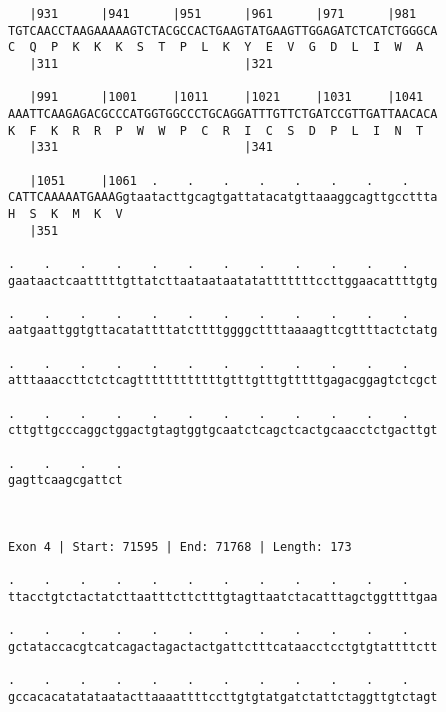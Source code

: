 \documentclass{article}
\begin{document}
\begin{Verbatim}
   |931      |941      |951      |961      |971      |981   
TGTCAACCTAAGAAAAAGTCTACGCCACTGAAGTATGAAGTTGGAGATCTCATCTGGGCA
C  Q  P  K  K  K  S  T  P  L  K  Y  E  V  G  D  L  I  W  A  
   |311                          |321                       
  
   |991      |1001     |1011     |1021     |1031     |1041  
AAATTCAAGAGACGCCCATGGTGGCCCTGCAGGATTTGTTCTGATCCGTTGATTAACACA
K  F  K  R  R  P  W  W  P  C  R  I  C  S  D  P  L  I  N  T  
   |331                          |341                       
  
   |1051     |1061  .    .    .    .    .    .    .    .    
CATTCAAAAATGAAAGgtaatacttgcagtgattatacatgttaaaggcagttgccttta
H  S  K  M  K  V                                            
   |351                                                     
  
.    .    .    .    .    .    .    .    .    .    .    .    
gaataactcaatttttgttatcttaataataatatatttttttccttggaacattttgtg
                                                            
.    .    .    .    .    .    .    .    .    .    .    .    
aatgaattggtgttacatattttatcttttggggcttttaaaagttcgttttactctatg
                                                            
.    .    .    .    .    .    .    .    .    .    .    .    
atttaaaccttctctcagttttttttttttgtttgtttgtttttgagacggagtctcgct
                                                            
.    .    .    .    .    .    .    .    .    .    .    .    
cttgttgcccaggctggactgtagtggtgcaatctcagctcactgcaacctctgacttgt
                                                            
.    .    .    .
gagttcaagcgattct
                
                
 
Exon 4 | Start: 71595 | End: 71768 | Length: 173
 
.    .    .    .    .    .    .    .    .    .    .    .    
ttacctgtctactatcttaatttcttctttgtagttaatctacatttagctggttttgaa
                                                            
.    .    .    .    .    .    .    .    .    .    .    .    
gctataccacgtcatcagactagactactgattctttcataacctcctgtgtattttctt
                                                            
.    .    .    .    .    .    .    .    .    .    .    .    
gccacacatatataatacttaaaattttccttgtgtatgatctattctaggttgtctagt
                                                            

\end{Verbatim}
\end{document}
